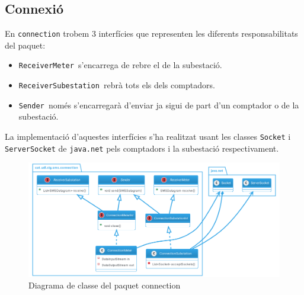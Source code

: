 \subsection{Connexió}
En \texttt{connection} trobem 3 interfícies que representen les diferents responsabilitats del paquet:
\begin{itemize}
	\item \texttt{ReceiverMeter }s'encarrega de rebre el \dto de la subestació.
	\item \texttt{ReceiverSubestation }rebrà tots els \dto dels comptadors.
	\item \texttt{Sender }només s'encarregarà d'enviar \dto ja sigui de part d'un comptador o de la subestació.
\end{itemize}
La implementació d'aquestes interfícies s'ha realitzat usant les classes \texttt{Socket} i \texttt{ServerSocket} de \texttt{java.net} pels comptadors i la subestació respectivament.
\begin{figure}[H]
	\centering
	\includegraphics[width=16cm]{classes/connection.png}
	\caption{Diagrama de classe del paquet connection}
	\label{fig:connection}
\end{figure}
